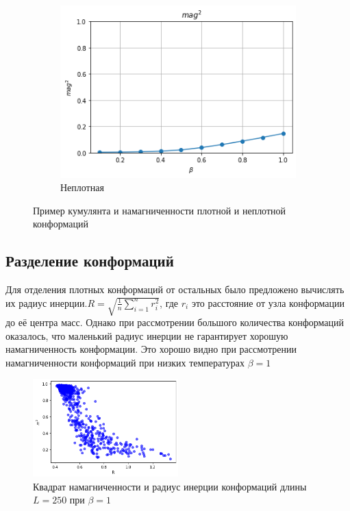 \begin{figure}[ht]
\begin{subfigure}[t]{0.48\textwidth}
		\includegraphics[width=\textwidth]{../images/loose_magnetization.png} 
		\caption{Неплотная}
	\end{subfigure}
	\caption{Пример кумулянта и намагниченности плотной и неплотной конформаций}
\end{figure}


\subsection{Разделение конформаций}

Для отделения плотных конформаций от остальных было предложено вычислять их радиус инерции.$R = \sqrt{\frac{1}{n}\sum_{i=1}^{n}r_{i}^{2}}$, где $r_i$ это расстояние от узла конформации до её центра масс. Однако при рассмотрении большого количества конформаций оказалось, что маленький радиус инерции не гарантирует хорошую намагниченность конформации. Это хорошо видно при рассмотрении намагниченности конформаций при низких температурах $\beta = 1$

\begin{figure}[ht]
	\centering
	\includegraphics[width=0.5\textwidth]{../images/mag2_to_R_L250.png} 
	\caption{Квадрат намагниченности и радиус инерции конформаций длины $L = 250$ при $\beta = 1$}
	\label{fig:mag2_to_R} 
\end{figure}

